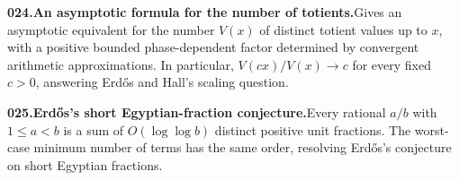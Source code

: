 \documentclass[11pt,a4paper]{article}
\begin{document}
  \par \begin{minipage}{\linewidth}
  \fontsize{10.5}{12.6}\selectfont\RaggedRight
  \hypertarget{result 024}{}
  {\bfseries\textcolor{muted}{024.}\enspace An asymptotic formula for the number of totients.}\enspace Gives an asymptotic equivalent for the number $V(x)$ of distinct totient values up to $x$, with a positive bounded phase-dependent factor determined by convergent arithmetic approximations. In particular, $V(cx)/V(x)\to c$ for every fixed $c>0$, answering Erd\H{o}s and Hall’s scaling question.\par
  \end{minipage}\par\vspace{5pt}



  \par \begin{minipage}{\linewidth}
  \fontsize{10.5}{12.6}\selectfont\RaggedRight
  \hypertarget{result 025}{}
  {\bfseries\textcolor{muted}{025.}\enspace Erd\H{o}s’s short Egyptian-fraction conjecture.}\enspace Every rational $a/b$ with $1\le a<b$ is a sum of $O(\log\log b)$ distinct positive unit fractions. The worst-case minimum number of terms has the same order, resolving Erd\H{o}s’s conjecture on short Egyptian fractions.\par
  \end{minipage}\par\vspace{5pt}
\end{document}
